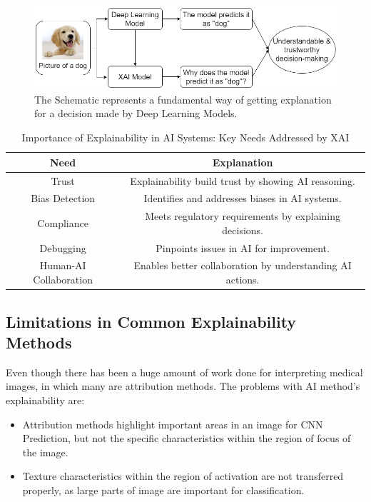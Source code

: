 \begin{figure}[h!]
    \centering
    \includegraphics[width=\textwidth]{Images/xai_intro.png}
    \caption[Fundamental way of explaining Deep Learning Models using XAI]{The Schematic represents a fundamental way of getting explanation for a decision made by Deep Learning Models.\cite{XAI_Medical}}
\end{figure}

\begin{table}[h!]
    \centering
    \caption[Importance of Explainability in AI Systems]{Importance of Explainability in AI Systems: Key Needs Addressed by XAI}
    \begin{tabular}{|c|c|}
    \hline
    \textbf{Need} & \textbf{Explanation} \\
    \hline
    Trust & Explainability build trust by showing AI reasoning. \\
    \hline
    Bias Detection & Identifies and addresses biases in AI systems. \\
    \hline
    Compliance & Meets regulatory requirements by explaining decisions. \\
    \hline
    Debugging & Pinpoints issues in AI for improvement. \\
    \hline
    Human-AI Collaboration & Enables better collaboration by understanding AI actions. \\
    \hline
    \end{tabular}
\end{table}

\clearpage

\subsection{Limitations in Common Explainability Methods}

\noindent
Even though there has been a huge amount of work done for interpreting medical images, in which many are attribution methods. The problems with AI method's explainability are:

\begin{itemize}
    \item Attribution methods highlight important areas in an image for CNN Prediction, but not the specific characteristics within the region of focus of the image.
    \item Texture characteristics within the region of activation are not transferred properly, as large parts of image are important for classification.
\end{itemize}

